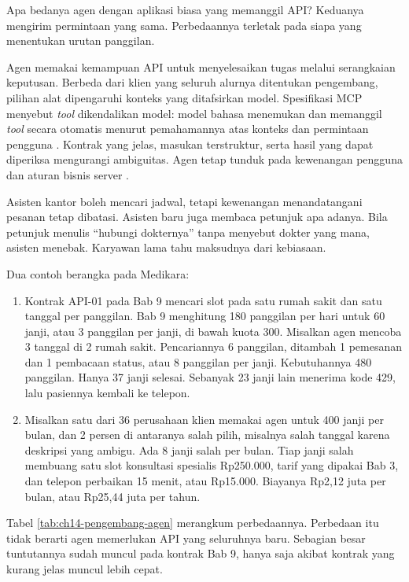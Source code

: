Apa bedanya agen dengan aplikasi biasa yang memanggil API? Keduanya mengirim permintaan yang sama. Perbedaannya terletak pada siapa yang
menentukan urutan panggilan.

Agen memakai kemampuan API untuk menyelesaikan tugas melalui serangkaian keputusan. Berbeda dari klien yang seluruh alurnya ditentukan
pengembang, pilihan alat dipengaruhi konteks yang ditafsirkan model. Spesifikasi MCP menyebut \textit{tool} dikendalikan model: model bahasa
menemukan dan memanggil \textit{tool} secara otomatis menurut pemahamannya atas konteks dan permintaan pengguna \cite{c14-mcp-tools}. Kontrak
yang jelas, masukan terstruktur, serta hasil yang dapat diperiksa mengurangi ambiguitas. Agen tetap tunduk pada kewenangan pengguna dan aturan
bisnis server \cite{mcp2026}.

Asisten kantor boleh mencari jadwal, tetapi kewenangan menandatangani pesanan tetap dibatasi. Asisten baru juga membaca petunjuk apa adanya.
Bila petunjuk menulis ``hubungi dokternya'' tanpa menyebut dokter yang mana, asisten menebak. Karyawan lama tahu maksudnya dari kebiasaan.

Dua contoh berangka pada Medikara:
\begin{enumerate}
  \item Kontrak API-01 pada Bab 9 mencari slot pada satu rumah sakit dan satu tanggal per panggilan. Bab 9 menghitung 180 panggilan per hari untuk 60
        janji, atau 3 panggilan per janji, di bawah kuota 300. Misalkan agen mencoba 3 tanggal di 2 rumah sakit. Pencariannya 6 panggilan, ditambah 1
        pemesanan dan 1 pembacaan status, atau 8 panggilan per janji. Kebutuhannya 480 panggilan. Hanya 37 janji selesai. Sebanyak 23 janji lain menerima
        kode 429, lalu pasiennya kembali ke telepon.
  \item Misalkan satu dari 36 perusahaan klien memakai agen untuk 400 janji per bulan, dan 2 persen di antaranya salah pilih, misalnya salah tanggal
        karena deskripsi yang ambigu. Ada 8 janji salah per bulan. Tiap janji salah membuang satu slot konsultasi spesialis Rp250.000, tarif yang dipakai
        Bab 3, dan telepon perbaikan 15 menit, atau Rp15.000. Biayanya Rp2,12 juta per bulan, atau Rp25,44 juta per tahun.
\end{enumerate}

Tabel \ref{tab:ch14-pengembang-agen} merangkum perbedaannya. Perbedaan itu tidak berarti agen memerlukan API yang seluruhnya baru. Sebagian besar
tuntutannya sudah muncul pada kontrak Bab 9, hanya saja akibat kontrak yang kurang jelas muncul lebih cepat.

